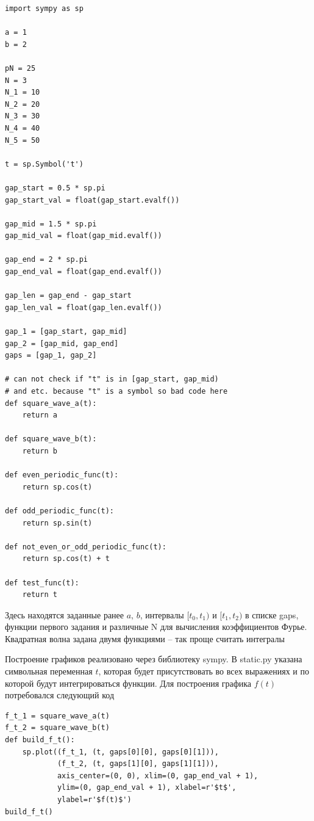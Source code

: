 \documentclass[a4paper, 16pt]{article}
\begin{document}
\begin{lstlisting}
import sympy as sp

a = 1
b = 2

pN = 25
N = 3
N_1 = 10
N_2 = 20
N_3 = 30
N_4 = 40
N_5 = 50

t = sp.Symbol('t')

gap_start = 0.5 * sp.pi
gap_start_val = float(gap_start.evalf())

gap_mid = 1.5 * sp.pi
gap_mid_val = float(gap_mid.evalf())

gap_end = 2 * sp.pi
gap_end_val = float(gap_end.evalf())

gap_len = gap_end - gap_start
gap_len_val = float(gap_len.evalf())

gap_1 = [gap_start, gap_mid]
gap_2 = [gap_mid, gap_end]
gaps = [gap_1, gap_2]

# can not check if "t" is in [gap_start, gap_mid)
# and etc. because "t" is a symbol so bad code here
def square_wave_a(t):
    return a

def square_wave_b(t):
    return b

def even_periodic_func(t):
    return sp.cos(t)

def odd_periodic_func(t):
    return sp.sin(t)

def not_even_or_odd_periodic_func(t):
    return sp.cos(t) + t

def test_func(t):
    return t
\end{lstlisting}
\noindent Здесь находятся заданные ранее $a,\,b$,
интервалы $[t_0, t_1)$ и $[t_1, t_2)$ в списке gaps, 
функции первого задания и различные N для вычисления
коэффициентов Фурье. Квадратная волна задана
двумя функциями -- так проще считать интегралы


\newpage
\noindent Построение графиков реализовано через библиотеку
sympy. В static.py указана символьная переменная $t$, которая
будет присутствовать во всех выражениях и по которой будут 
интегрироваться функции. Для построения графика $f(t)$
потребовался следующий код
\begin{lstlisting}[belowskip=-3mm]
f_t_1 = square_wave_a(t)
f_t_2 = square_wave_b(t)    
def build_f_t():
    sp.plot((f_t_1, (t, gaps[0][0], gaps[0][1])), 
            (f_t_2, (t, gaps[1][0], gaps[1][1])), 
            axis_center=(0, 0), xlim=(0, gap_end_val + 1), 
            ylim=(0, gap_end_val + 1), xlabel=r'$t$', 
            ylabel=r'$f(t)$')
build_f_t() 
\end{lstlisting}
\end{document}
